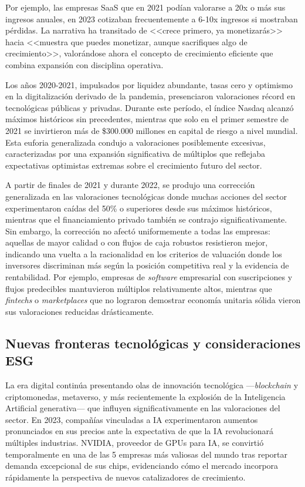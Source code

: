 Por ejemplo, las empresas SaaS que en 2021 podían valorarse a 20x o más sus ingresos anuales, en 2023 cotizaban frecuentemente a 6-10x ingresos si mostraban pérdidas. La narrativa ha transitado de <<crece primero, ya monetizarás>> hacia <<muestra que puedes monetizar, aunque sacrifiques algo de crecimiento>>, valorándose ahora el concepto de crecimiento eficiente que combina expansión con disciplina operativa.

Los años 2020-2021, impulsados por liquidez abundante, tasas cero y optimismo en la digitalización derivado de la pandemia, presenciaron valoraciones récord en tecnológicas públicas y privadas. Durante este período, el índice Nasdaq alcanzó máximos históricos sin precedentes, mientras que solo en el primer semestre de 2021 se invirtieron más de \$300.000 millones en capital de riesgo a nivel mundial. Esta euforia generalizada condujo a valoraciones posiblemente excesivas, caracterizadas por una expansión significativa de múltiplos que reflejaba expectativas optimistas extremas sobre el crecimiento futuro del sector.

A partir de finales de 2021 y durante 2022, se produjo una corrección generalizada en las valoraciones tecnológicas donde muchas acciones del sector experimentaron caídas del 50\% o superiores desde sus máximos históricos, mientras que el financiamiento privado también se contrajo significativamente. Sin embargo, la corrección no afectó uniformemente a todas las empresas: aquellas de mayor calidad o con flujos de caja robustos resistieron mejor, indicando una vuelta a la racionalidad en los criterios de valuación donde los inversores discriminan más según la posición competitiva real y la evidencia de rentabilidad. Por ejemplo, empresas de \emph{software} empresarial con suscripciones y flujos predecibles mantuvieron múltiplos relativamente altos, mientras que \emph{fintechs} o \emph{marketplaces} que no lograron demostrar economía unitaria sólida vieron sus valoraciones reducidas drásticamente.

\subsection{Nuevas fronteras tecnológicas y consideraciones ESG}

La era digital continúa presentando olas de innovación tecnológica ---\emph{blockchain} y criptomonedas, metaverso, y más recientemente la explosión de la Inteligencia Artificial generativa--- que influyen significativamente en las valoraciones del sector. En 2023, compañías vinculadas a IA experimentaron aumentos pronunciados en sus precios ante la expectativa de que la IA revolucionará múltiples industrias. NVIDIA, proveedor de GPUs para IA, se convirtió temporalmente en una de las 5 empresas más valiosas del mundo tras reportar demanda excepcional de sus chips, evidenciando cómo el mercado incorpora rápidamente la perspectiva de nuevos catalizadores de crecimiento.

